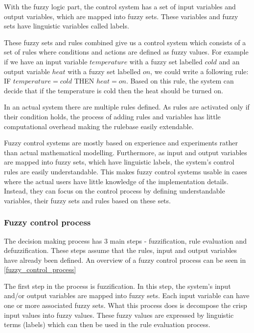 With the fuzzy logic part, the control system has a set of input variables and output variables, which are mapped into fuzzy sets. These variables and fuzzy sets have linguistic variables called labels. 

These fuzzy sets and rules combined give us a control system which consists of a set of rules where conditions and actions are defined as fuzzy values. For example if we have an input variable $temperature$ with a fuzzy set labelled $cold$ and an output variable $heat$ with a fuzzy set labelled $on$, we could write a following rule: IF $temperature = cold$ THEN $heat = on$. Based on this rule, the system can decide that if the temperature is cold then the heat should be turned on. 

In an actual system there are multiple rules defined. As rules are activated only if their condition holds, the process of adding rules and variables has little computational overhead making the rulebase easily extendable.

Fuzzy control systems are mostly based on experience and experiments rather than actual mathematical modelling. Furthermore, as input and output variables are mapped into fuzzy sets, which have linguistic labels, the system's control rules are easily understandable. This makes fuzzy control systems usable in cases where the actual users have little knowledge of the implementation details. Instead, they can focus on the control process by defining understandable variables, their fuzzy sets and rules based on these sets. 

\subsubsection{Fuzzy control process}

The decision making process has 3 main steps - fuzzification, rule evaluation and defuzzification. These steps assume that the rules, input and output variables have already been defined. An overview of a fuzzy control process can be seen in \autoref{fuzzy_control_process}

The first step in the process is fuzzification. In this step, the system's input and/or output variables are mapped into fuzzy sets. Each input variable can have one or more associated fuzzy sets. What this process does is decompose the crisp input values into fuzzy values. These fuzzy values are expressed by linguistic terms (labels) which can then be used in the rule evaluation process.

